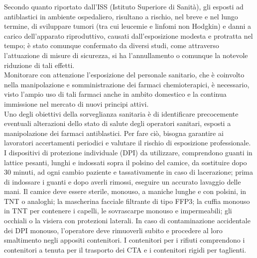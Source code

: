 Secondo quanto riportato dall'ISS (Istituto Superiore di Sanità), gli esposti ad antiblastici in ambiente 
ospedaliero, risultano a rischio, nel breve e nel lungo termine, di sviluppare tumori (tra cui leucemie e 
linfomi non Hodgkin) e danni a carico dell'apparato riproduttivo, causati dall'esposizione modesta e protratta nel 
tempo; è stato comunque confermato da diversi studi, come attraverso l'attuazione di misure di sicurezza, 
si ha l'annullamento o comunque la notevole riduzione di tali effetti\cite{ISSESPO}.\\
Monitorare con attenzione l'esposizione del personale sanitario, che è coinvolto nella manipolazione e 
somministrazione dei farmaci chemioterapici, è necessario, visto l'ampio uso di tali farmaci 
anche in ambito domestico e la continua immissione nel mercato di nuovi principi attivi.\\
Uno degli obiettivi della sorveglianza sanitaria è di identificare precocemente eventuali alterazioni dello stato 
di salute degli operatori sanitari, esposti a manipolazione dei farmaci antiblastici. Per fare ciò, 
bisogna garantire ai lavoratori accertamenti periodici e valutare il rischio di esposizione professionale\cite{ISSESPO}.\\

I dispositivi di protezione individuale (DPI) da utilizzare, comprendono guanti in lattice pesanti, lunghi e indossati 
sopra il polsino del camice, da sostituire dopo 30 minuti, ad ogni cambio paziente e tassativamente in caso di 
lacerazione; prima di indossare i guanti e dopo averli rimossi, eseguire un accurato lavaggio delle mani. 
Il camice deve essere sterile, monouso, a maniche lunghe e con polsini, in TNT o analoghi; la mascherina facciale 
filtrante di tipo FFP3; la cuffia monouso in TNT per contenere i capelli, le sovrascarpe monouso e impermeabili; 
gli occhiali o la visiera con protezioni laterali. In caso di contaminazione accidentale dei DPI monouso,
l’operatore deve rimuoverli subito e procedere al loro smaltimento negli appositi contenitori\cite{FNOPI}. 
I contenitori per i rifiuti comprendono i contenitori a tenuta per il trasporto dei CTA e i 
contenitori rigidi per taglienti.\\

